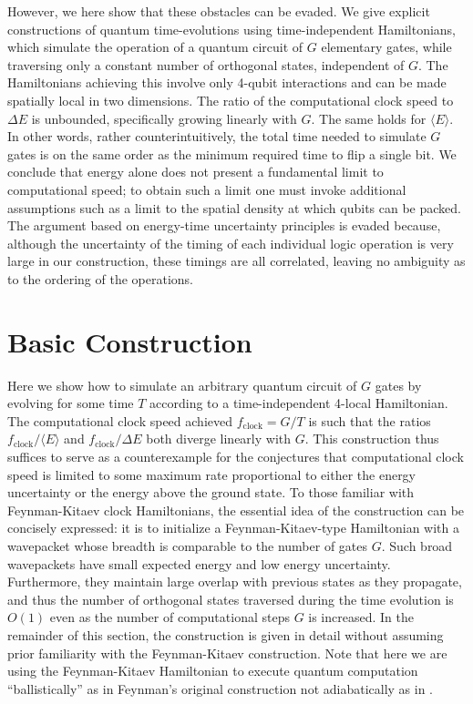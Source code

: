 \documentclass[11pt]{article}
\begin{document}
However, we here show that these obstacles can be evaded. We give explicit constructions of quantum time-evolutions using time-independent Hamiltonians, which simulate the operation of a quantum circuit of $G$ elementary gates, while traversing only a constant number of orthogonal states, independent of $G$. The Hamiltonians achieving this involve only 4-qubit interactions and can be made spatially local in two dimensions. The ratio of the computational clock speed to $\Delta E$ is unbounded, specifically growing linearly with $G$. The same holds for $\langle E \rangle$. In other words, rather counterintuitively, the total time needed to simulate $G$ gates is on the same order as the minimum required time to flip a single bit. We conclude that energy alone does not present a fundamental limit to computational speed; to obtain such a limit one must invoke additional assumptions such as a limit to the spatial density at which qubits can be packed. The argument based on energy-time uncertainty principles is evaded because, although the uncertainty of the timing of each individual logic operation is very large in our construction, these timings are all correlated, leaving no ambiguity as to the ordering of the operations.

\section{Basic Construction}
\label{sec:basic}

Here we show how to simulate an arbitrary quantum circuit of $G$ gates by evolving for some time $T$ according to a time-independent 4-local Hamiltonian. The computational clock speed achieved $f_{\mathrm{clock}}= G/T$ is such that the ratios  $f_{\mathrm{clock}}/\langle E \rangle$ and $f_{\mathrm{clock}}/\Delta E$ both diverge linearly with $G$. This construction thus suffices to serve as a counterexample for the conjectures that computational clock speed is limited to some maximum rate proportional to either the energy uncertainty or the energy above the ground state. To those familiar with Feynman-Kitaev clock Hamiltonians, the essential idea of the construction can be concisely expressed: it is to initialize a Feynman-Kitaev-type Hamiltonian with a wavepacket whose breadth is comparable to the number of gates $G$. Such broad wavepackets have small expected energy and low energy uncertainty. Furthermore, they maintain large overlap with previous states as they propagate, and thus the number of orthogonal states traversed during the time evolution is $O(1)$ even as the number of computational steps $G$ is increased. In the remainder of this section, the construction is given in detail without assuming prior familiarity with the Feynman-Kitaev construction. Note that here we are using the Feynman-Kitaev Hamiltonian to execute quantum computation ``ballistically'' as in Feynman's original construction \cite{F85} not adiabatically as in \cite{adiabatic}.
\end{document}
